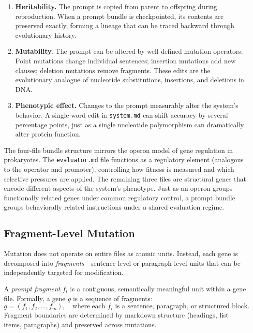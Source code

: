 \begin{enumerate}[leftmargin=1.8em]
  \item \textbf{Heritability.} The prompt is copied from parent to offspring during reproduction. When a prompt bundle is checkpointed, its contents are preserved exactly, forming a lineage that can be traced backward through evolutionary history.

  \item \textbf{Mutability.} The prompt can be altered by well-defined mutation operators. Point mutations change individual sentences; insertion mutations add new clauses; deletion mutations remove fragments. These edits are the evolutionary analogue of nucleotide substitutions, insertions, and deletions in DNA.

  \item \textbf{Phenotypic effect.} Changes to the prompt measurably alter the system's behavior. A single-word edit in \texttt{system.md} can shift accuracy by several percentage points, just as a single nucleotide polymorphism can dramatically alter protein function.
\end{enumerate}

\begin{bioinsight}
The four-file bundle structure mirrors the operon model of gene regulation in prokaryotes. The \texttt{evaluator.md} file functions as a regulatory element (analogous to the operator and promoter), controlling how fitness is measured and which selective pressures are applied. The remaining three files are structural genes that encode different aspects of the system's phenotype. Just as an operon groups functionally related genes under common regulatory control, a prompt bundle groups behaviorally related instructions under a shared evaluation regime.
\end{bioinsight}

\subsection{Fragment-Level Mutation}

Mutation does not operate on entire files as atomic units. Instead, each gene is decomposed into \emph{fragments}---sentence-level or paragraph-level units that can be independently targeted for modification.

\begin{dogmadef}
A \emph{prompt fragment} $f_i$ is a contiguous, semantically meaningful unit within a gene file. Formally, a gene $g$ is a sequence of fragments:
\begin{equation}
g = (f_1, f_2, \ldots, f_m), \quad \text{where each } f_i \text{ is a sentence, paragraph, or structured block.}
\end{equation}
Fragment boundaries are determined by markdown structure (headings, list items, paragraphs) and preserved across mutations.
\end{dogmadef}

